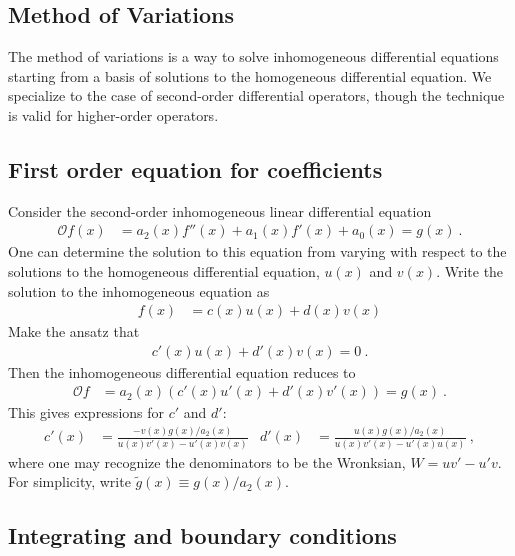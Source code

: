 \begin{subappendices}

\section{Method of Variations}
\label{app:method:of:variations}

The method of variations is a way to solve inhomogeneous differential equations starting from a basis of solutions to the homogeneous differential equation. We specialize to the case of second-order differential operators, though the technique is valid for higher-order operators.

\subsection{First order equation for coefficients}

Consider the second-order inhomogeneous linear differential equation
\begin{align}
	\mathcal Of(x) &= a_2(x)f''(x) + a_1(x) f'(x) + a_0(x) = g(x) \ .
\end{align}
One can determine the solution to this equation from varying with respect to the solutions to the homogeneous differential equation, $u(x)$ and $v(x)$. Write the solution to the inhomogeneous equation as
\begin{align}
	f(x) &= c(x)u(x) + d(x)v(x)
\end{align}
Make the ansatz that
\begin{align}
	c'(x) u(x) + d'(x) v(x) = 0 \ .
	\label{eq:method:of:variations:ansatz}
\end{align}
Then the inhomogeneous differential equation reduces to
\begin{align}
	\mathcal Of &= a_2(x)\left(c'(x) u'(x) + d'(x) v'(x)\right) =g(x) \ .
\end{align}
This gives expressions for $c'$ and $d'$:
\begin{align}
	c'(x) &= \frac{-v(x)g(x)/a_2(x)}{u(x) v'(x) - u'(x) v(x)}
	&
	d'(x) &= \frac{u(x)g(x)/a_2(x)}{u(x) v'(x) - u'(x) u(x)} \ ,
	\label{eq:method:of:variations:first:order}
\end{align}
where one may recognize the denominators to be the Wronksian, $W = uv' - u'v$. For simplicity, write $\tilde g(x) \equiv g(x)/a_2(x)$.

\subsection{Integrating and boundary conditions}


\end{subappendices}
